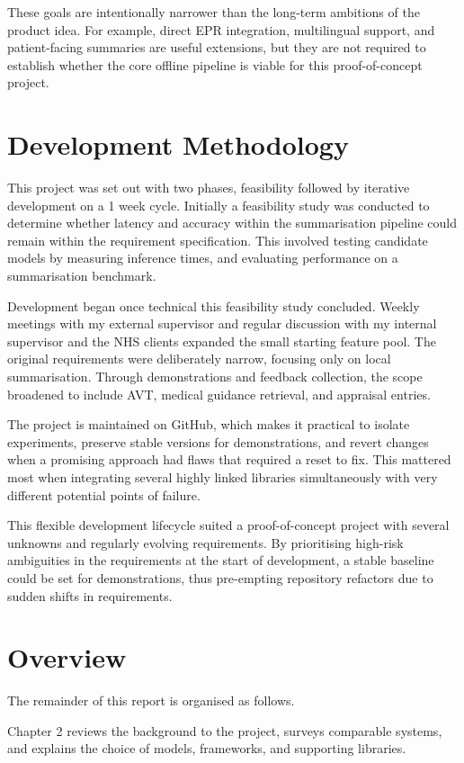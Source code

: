 These goals are intentionally narrower than the long-term ambitions of the product idea. For example, direct EPR integration, multilingual support, and patient-facing summaries are useful extensions, but they are not required to establish whether the core offline pipeline is viable for this proof-of-concept project.

\section{Development Methodology}
This project was set out with two phases, feasibility followed by iterative development on a 1 week cycle. Initially a feasibility study was conducted to determine whether latency and accuracy within the summarisation pipeline could remain within the requirement specification. This involved testing candidate models by measuring inference times, and evaluating performance on a summarisation benchmark.

Development began once technical this feasibility study concluded. Weekly meetings with my external supervisor and regular discussion with my internal supervisor and the NHS clients expanded the small starting feature pool. The original requirements were deliberately narrow, focusing only on local summarisation. Through demonstrations and feedback collection, the scope broadened to include AVT, medical guidance retrieval, and appraisal entries. 

The project is maintained on GitHub, which makes it practical to isolate experiments, preserve stable versions for demonstrations, and revert changes when a promising approach had flaws that required a reset to fix. This mattered most when integrating several highly linked libraries simultaneously with very different potential points of failure.

This flexible development lifecycle suited a proof-of-concept project with several unknowns and regularly evolving requirements. By prioritising high-risk ambiguities in the requirements at the start of development, a stable baseline could be set for demonstrations, thus pre-empting repository refactors due to sudden shifts in requirements.

\section{Overview}
The remainder of this report is organised as follows.

Chapter 2 reviews the background to the project, surveys comparable systems, and explains the choice of models, frameworks, and supporting libraries.

